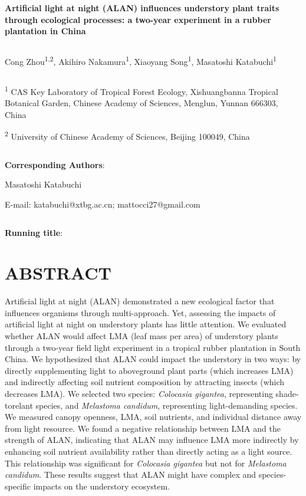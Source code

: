 \documentclass[
  12pt,
  letterpaper,
  DIV=11,
  numbers=noendperiod]{scrartcl}
\author{}
\date{}
\begin{document}
\ifdefined\Shaded\renewenvironment{Shaded}{\begin{tcolorbox}[frame hidden, interior hidden, breakable, boxrule=0pt, borderline west={3pt}{0pt}{shadecolor}, enhanced, sharp corners]}{\end{tcolorbox}}\fi

\textbf{Artificial light at night (ALAN) influences understory plant
traits through ecological processes: a two-year experiment in a rubber
plantation in China}

\[ \]

Cong Zhou\textsuperscript{1,2}, Akihiro Nakamura\textsuperscript{1},
Xiaoyang Song\textsuperscript{1}, Masatoshi Katabuchi\textsuperscript{1}

\[ \]

\textsuperscript{1} CAS Key Laboratory of Tropical Forest Ecology,
Xishuangbanna Tropical Botanical Garden, Chinese Academy of Sciences,
Menglun, Yunnan 666303, China

\textsuperscript{2} University of Chinese Academy of Sciences, Beijing
100049, China

\[ \]

\textbf{Corresponding Authors}:

Masatoshi Katabuchi

E-mail: katabuchi@xtbg.ac.cn; mattocci27@gmail.com

\[ \]

\textbf{Running title}:

\newpage

\hypertarget{abstract}{%
\section{ABSTRACT}\label{abstract}}

Artificial light at night (ALAN) demonstrated a new ecological factor
that influences organisms through multi-approach. Yet, assessing the
impacts of artificial light at night on understory plants has little
attention. We evaluated whether ALAN would affect LMA (leaf mass per
area) of understory plants through a two-year field light experiment in
a tropical rubber plantation in South China. We hypothesized that ALAN
could impact the understory in two ways: by directly supplementing light
to aboveground plant parts (which increases LMA) and indirectly
affecting soil nutrient composition by attracting insects (which
decreases LMA). We selected two species: \emph{Colocasia gigantea},
representing shade-torelant species, and \emph{Melastoma candidum},
representing light-demanding species. We measured canopy openness, LMA,
soil nutrients, and individual distance away from light resource. We
found a negative relationship between LMA and the strength of ALAN,
indicating that ALAN may influence LMA more indirectly by enhancing soil
nutrient availability rather than directly acting as a light source.
This relationship was significant for \emph{Colocasia gigantea} but not
for \emph{Melastoma candidum}. These results suggest that ALAN might
have complex and species-specific impacts on the understory ecosystem.
\end{document}
